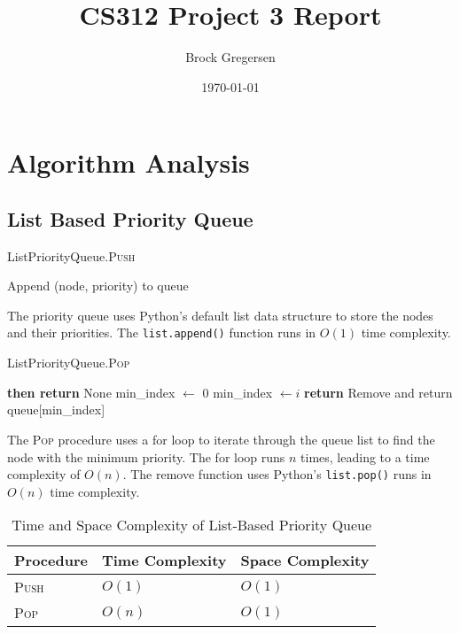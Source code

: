 \documentclass[12pt]{article}
\title{CS312 Project 3 Report}
\author{Brock Gregersen}
\date{\today}
\begin{document}
\maketitle
\tableofcontents

\newpage

\section{Algorithm Analysis}

\subsection{List Based Priority Queue}

\begin{algorithm}
    \caption{ListPriorityQueue.\textsc{Push}}
    \begin{algorithmic}[1]
        \State Append (node, priority) to queue 
    \end{algorithmic}
\end{algorithm}

The priority queue uses Python's default list data structure to store the nodes
and their priorities. The \texttt{list.append()} function runs in $O(1)$ time complexity.

\begin{algorithm}[H]
    \caption{ListPriorityQueue.\textsc{Pop}}
    \begin{algorithmic}[1]
            \State \textbf{then return} None
        \EndIf
        \State min\_index $\gets$ 0
         
                \State min\_index $\gets i$
            \EndIf
        \EndFor
        \State \textbf{return} Remove and return queue[min\_index] 
    \end{algorithmic}
\end{algorithm}

The \textsc{Pop} procedure uses a for loop to iterate through the queue list
to find the node with the minimum priority. The for loop runs $n$ times, leading
to a time complexity of $O(n)$. The remove function uses Python's \texttt{list.pop()}
runs in $O(n)$ time complexity.


\begin{table}[h!]
    \centering
    \begin{threeparttable}
        \caption{Time and Space Complexity of List-Based Priority Queue}
        \begin{tabular}{@{}lll@{}}
            \toprule
            \textbf{Procedure} & \textbf{Time Complexity} & \textbf{Space Complexity} \\ \midrule
            \textsc{Push}      & $O(1)$                  & $O(1)$                    \\
            \textsc{Pop}       & $O(n)$                  & $O(1)$                    \\
            \bottomrule
        \end{tabular}
    \end{threeparttable}
\end{table}
\end{document}
